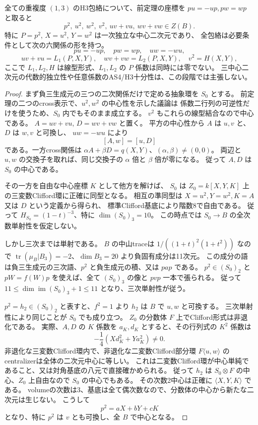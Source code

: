 \begin{theorem}[正生成元の平方と負反交換子も中心]
\label{thm:h3-order2-positive-square-central}
全ての重複度 $(1,3)$ のH3包絡について、前定理の座標を
$pu=-up,pw=wp$ と取ると
\[
 p^2,\ u^2,\ w^2,\ v^2,\ uv+vu,\ wv+vw\in Z(B).
\]
特に $P=p^2$, $X=u^2$, $Y=w^2$ は一次独立な中心二次元であり、
全包絡は必要条件として次の六関係の形を持つ。
\[
 pu=-up,\quad pw=wp,\quad uw=-wu,
\]
\[
 uv+vu=L_1(P,X,Y),\quad wv+vw=L_2(P,X,Y),\quad
 v^2=H(X,Y),
\]
ここで $L_1,L_2,H$ は線型形式、$L_1,L_2$ の $P$ 係数は同時には零でない。
三中心二次元の代数的独立性や任意係数のAS4/H3十分性は、この段階では主張しない。
\end{theorem}
\begin{proof}
まず負三生成元の三つの二次関係だけで定める抽象環を $S_0$ とする。
前定理の二つのcross表示で、$u^2,w^2$ の中心性を示した議論は
係数二行列の可逆性だけを使うため、$S_0$ 内でもそのまま成立する。
$v^2$ もこれらの線型結合なので中心である。
$A=uv+vu$, $D=wv+vw$ と置く。
平方の中心性から $A$ は $u,v$ と、$D$ は $w,v$ と可換し、
$uw=-wu$ により
\[
 [A,w]=[u,D]
\]
である。一方cross関係は $\alpha A+\beta D=q(X,Y)$、$(\alpha,\beta)\ne(0,0)$。
両辺と $u,w$ の交換子を取れば、同じ交換子の $\alpha$ 倍と $\beta$ 倍が零になる。
従って $A,D$ は $S_0$ の中心である。

その一方を自由な中心座標 $K$ として他方を解けば、
$S_0$ は $Z_0=k[X,Y,K]$ 上の三変数Clifford環に正確に同型となる。
相互の準同型は $X=u^2,Y=w^2,K=A$ 又は $D$ という定義から得られ、
標準Clifford基底により階数8で自由である。
従って $H_{S_0}=(1-t)^{-3}$、特に $\dim(S_0)_3=10$。
この時点では $S_0\to B$ の全次数単射性を仮定しない。

しかし三次までは単射である。
$B$ の中山traceは $1/((1+t)^2(1+t^2))$ なので
$\operatorname{tr}(\mu_B|B_3)=-2$、$\dim B_3=20$ より負固有成分は11次元。
この成分の語は負三生成元の三次語、$p^2$ と負生成元の積、又は $pap$ である。
$p^2\in(S_0)_2$ と $pW=f(W)p$ を使えば、全て $(S_0)_3$ の像と $pvp$ 一本で張られる。
従って $11\le\dim\operatorname{im}(S_0)_3+1\le11$ となり、三次単射性が従う。

$p^2=h_2\in(S_0)_2$ と表すと、$f^2=1$ より $h_2$ は $B$ で $u,w$ と可換する。
三次単射性により同じことが $S_0$ でも成り立つ。
$Z_0$ の分数体 $F$ 上でClifford形式は非退化である。
実際、$A,D$ の $K$ 係数を $a_K,d_K$ とすると、その行列式の $K^2$ 係数は
\[
 -\frac14(Xd_K^2+Ya_K^2)\ne0.
\]
非退化な三変数Clifford環内で、非退化な二変数Clifford部分環
$F\langle u,w\rangle$ のcentralizerは全体の二次元中心に等しい。
これは二変数Clifford環が中心単純であること、又は対角基底の八元で直接確かめられる。
従って $h_2$ は $S_0\otimes F$ の中心、$Z_0$ 上自由なので $S_0$ の中心でもある。
その次数2中心は正確に $\langle X,Y,K\rangle$ である。
volumeの次数は3、基底は全て偶次数なので、分数体の中心から新たな二次元は生じない。
こうして
\[
 p^2=aX+bY+cK
\]
となり、特に $p^2$ は $v$ とも可換し、全 $B$ で中心となる。


\end{proof}
